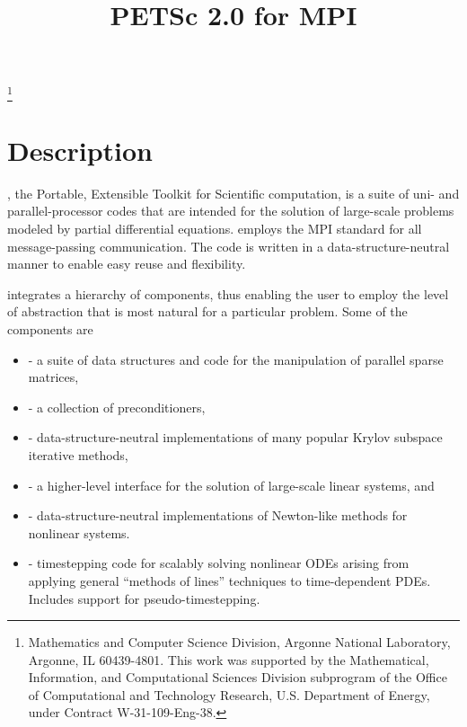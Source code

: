 \pagestyle{empty}

\pagestyle{empty}
\title{PETSc 2.0 for MPI}
\thanks{Mathematics and Computer Science Division,
Argonne National Laboratory,
Argonne, IL 60439-4801.
This work was supported by the Mathematical,
        Information, and Computational Sciences Division subprogram of
        the Office of Computational and Technology Research,
        U.S. Department of Energy, under Contract W-31-109-Eng-38.}

\date{}
\maketitle

\newcommand{\vsp}{\vspace{-1.5mm}}


\section*{Description}

, the Portable, Extensible Toolkit for Scientific computation,
is a suite of uni- and parallel-processor codes that are intended for
the solution of large-scale problems modeled by partial differential
equations.   employs the MPI standard for all
message-passing communication.  The code is written in a
data-structure-neutral manner to enable easy reuse and flexibility.

 integrates a hierarchy of components, thus
enabling the user to employ the level of abstraction that is most
natural for a particular problem.  Some of the components are
\vspace{-.4cm}
\begin{itemize}
\item {} - a suite of data structures and code
      for the manipulation of parallel sparse matrices,
\vsp
\item {} - a collection of preconditioners,
\vsp
\item {} - data-structure-neutral implementations of
      many popular Krylov subspace iterative methods,
\vsp
\item {} - a higher-level interface for the solution of
      large-scale linear systems, and
\vsp
\item {} - data-structure-neutral implementations of Newton-like
      methods for nonlinear systems.
\vsp
\item {} - timestepping code for scalably solving 
      nonlinear ODEs arising from applying general ``methods of lines'' 
      techniques to time-dependent PDEs. Includes support for 
      pseudo-timestepping. 
\end{itemize}
\vsp

